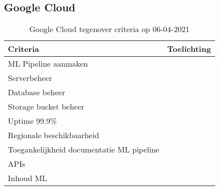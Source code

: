 \subsection*{Google Cloud}\label{appendix:detailed-overview-of-cloud-computing-platforms:google-cloud}
\begin{table}[hbt!]
  \centering
  \begin{tabular}{|p{.2\linewidth}|p{.74\linewidth}|}
  \hline
  \textbf{Criteria} & \textbf{Toelichting} \\ \hline
    ML Pipeline \newline aanmaken
    &

    \\ \hline

    Serverbeheer
    &

    \\ \hline

    Database beheer
    &

    \\ \hline

    Storage \newline bucket beheer
    &

    \\ \hline

    Uptime 99.9\%
    &

    \\ \hline

    Regionale \newline beschikbaarheid
    &

    \\ \hline

    Toegankelijkheid documentatie ML pipeline
    &

    \\ \hline

    APIs
    &

    \\ \hline

    Inhoud ML
    &

    \\ \hline
  \end{tabular}
  \caption{Google Cloud tegenover criteria op 06-04-2021}
  \label{table:google-cloud-against-criteria}
\end{table}

\newpage

